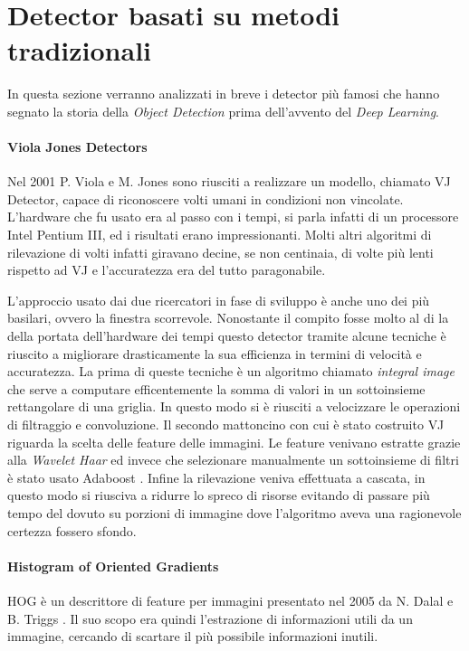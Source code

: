 \section{Detector basati su metodi tradizionali}
\label{sec:traditional_method}
In questa sezione verranno analizzati in breve i detector più famosi che hanno segnato la storia della \textit{Object Detection} prima dell'avvento del \textit{Deep Learning}.
\paragraph{Viola Jones Detectors}
Nel 2001 P. Viola e M. Jones \cite{viola2001rapid, viola2004robust} sono riusciti a realizzare un modello, chiamato \ac{VJ} Detector, capace di riconoscere volti umani in condizioni non vincolate. L'hardware che fu usato era al passo con i tempi, si parla infatti di un processore Intel Pentium III, ed i risultati erano impressionanti. Molti altri algoritmi di rilevazione di volti infatti giravano decine, se non centinaia, di volte più lenti rispetto ad \ac{VJ} e l'accuratezza era del tutto paragonabile. 

L'approccio usato dai due ricercatori in fase di sviluppo è anche uno dei più basilari, ovvero la finestra scorrevole. Nonostante il compito fosse molto al di la della portata dell'hardware dei tempi questo detector tramite alcune tecniche è riuscito a migliorare drasticamente la sua efficienza in termini di velocità e accuratezza. 
La prima di queste tecniche è un algoritmo chiamato \textit{integral image} che serve a computare efficentemente la somma di valori in un sottoinsieme rettangolare di una griglia. In questo modo si è riusciti a velocizzare le operazioni di filtraggio e convoluzione. 
Il secondo mattoncino con cui è stato costruito \ac{VJ} riguarda la scelta delle feature delle immagini. Le feature venivano estratte grazie alla \textit{Wavelet Haar} ed invece che selezionare manualmente un sottoinsieme di filtri è stato usato Adaboost \cite{freund1999short}. 
Infine la rilevazione veniva effettuata a cascata, in questo modo si riusciva a ridurre lo spreco di risorse evitando di passare più tempo del dovuto su porzioni di immagine dove l'algoritmo aveva una ragionevole certezza fossero sfondo. 
\paragraph{Histogram of Oriented Gradients}
\ac{HOG} è un descrittore di feature per immagini presentato nel 2005 da N. Dalal e B. Triggs \cite{dalal2005histograms}. Il suo scopo era quindi l'estrazione di informazioni utili da un immagine, cercando di scartare il più possibile informazioni inutili. 

